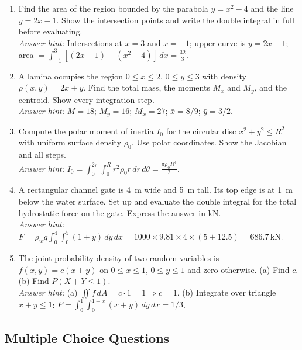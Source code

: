 \documentclass[12pt,a4paper]{article}
\begin{document}
\begin{enumerate}[label=\textbf{D\arabic*.}]

  \item Find the area of the region bounded by the parabola \(y = x^2 - 4\) and the line \(y = 2x - 1\). Show the intersection points and write the double integral in full before evaluating. \\
  \textit{Answer hint:} Intersections at \(x = 3\) and \(x = -1\); upper curve is \(y = 2x-1\); area \(= \int_{-1}^{3}[(2x-1)-(x^2-4)]\,dx = \tfrac{32}{3}\).

  \item A lamina occupies the region \(0 \leq x \leq 2\), \(0 \leq y \leq 3\) with density \(\rho(x,y) = 2x + y\). Find the total mass, the moments \(M_x\) and \(M_y\), and the centroid. Show every integration step. \\
  \textit{Answer hint:} \(M = 18\); \(M_y = 16\); \(M_x = 27\); \(\bar{x} = 8/9\); \(\bar{y} = 3/2\).

  \item Compute the polar moment of inertia \(I_0\) for the circular disc \(x^2 + y^2 \leq R^2\) with uniform surface density \(\rho_0\). Use polar coordinates. Show the Jacobian and all steps. \\
  \textit{Answer hint:} \(I_0 = \int_0^{2\pi}\int_0^R r^2 \rho_0 r\,dr\,d\theta = \tfrac{\pi\rho_0 R^4}{2}\).

  \item A rectangular channel gate is 4~m wide and 5~m tall. Its top edge is at 1~m below the water surface. Set up and evaluate the double integral for the total hydrostatic force on the gate. Express the answer in kN. \\
  \textit{Answer hint:} \(F = \rho_w g \int_0^4\int_0^5(1+y)\,dy\,dx = 1000 \times 9.81 \times 4\times(5 + 12.5) = 686.7\,\text{kN}\).

  \item The joint probability density of two random variables is \(f(x,y) = c(x+y)\) on \(0 \leq x \leq 1\), \(0 \leq y \leq 1\) and zero otherwise. (a) Find \(c\). (b) Find \(P(X + Y \leq 1)\). \\
  \textit{Answer hint:} (a) \(\iint f\,dA = c \cdot 1 = 1 \Rightarrow c = 1\). (b) Integrate over triangle \(x+y \leq 1\): \(P = \int_0^1\int_0^{1-x}(x+y)\,dy\,dx = 1/3\).

\end{enumerate}

\subsection*{Multiple Choice Questions}
\end{document}
